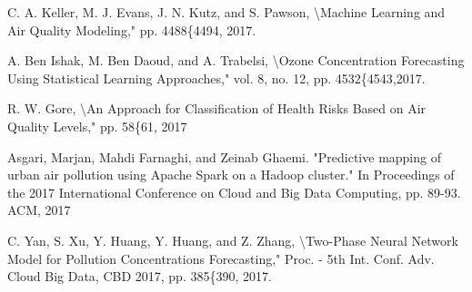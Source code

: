\documentclass{article}
\begin{document}
\begin{thebibliography}{9}
C. A. Keller, M. J. Evans, J. N. Kutz, and S. Pawson, \textbackslash Machine Learning and Air Quality Modeling," pp. 4488\{4494, 2017.

 A. Ben Ishak, M. Ben Daoud, and A. Trabelsi, \textbackslash Ozone Concentration
Forecasting Using Statistical Learning Approaches," vol. 8, no. 12, pp.
4532\{4543,2017.

R. W. Gore, \textbackslash An Approach for Classification of Health Risks Based on
Air Quality Levels," pp. 58\{61, 2017

Asgari, Marjan, Mahdi Farnaghi, and Zeinab Ghaemi. "Predictive
mapping of urban air pollution using Apache Spark on a Hadoop
cluster." In Proceedings of the 2017 International Conference on
Cloud and Big Data Computing, pp. 89-93. ACM, 2017

C. Yan, S. Xu, Y. Huang, Y. Huang, and Z. Zhang, \textbackslash Two-Phase Neural
Network Model for Pollution Concentrations Forecasting," Proc. - 5th
Int. Conf. Adv. Cloud Big Data, CBD 2017, pp. 385\{390, 2017.
\end{thebibliography}
\end{document}
